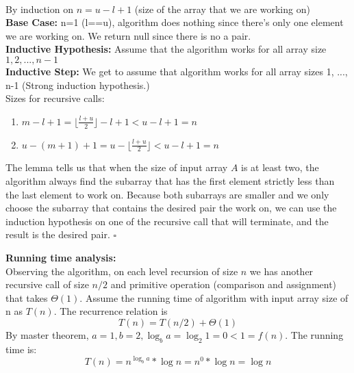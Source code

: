 \documentclass{article}
\begin{document}
\\By induction on $n = u-l+1$ (size of the array that we are working on)
\\\textbf{Base Case:} n=1 (l==u), algorithm does nothing since there's only one element we are working on. We return null since there is no a pair.
\\\textbf{Inductive Hypothesis:} Assume that the algorithm works for all array size $1, 2, ..., n-1$
\\\textbf{Inductive Step:} We get to assume that algorithm works
for all array sizes 1, ..., n-1 (Strong induction hypothesis.) 
\\Sizes for recursive calls:
\begin{enumerate}
    \item $m-l+1 = \lfloor \frac{l+u}{2}\rfloor - l + 1 < u-l+1=n$
    \item $u-(m+1)+1 = u-\lfloor \frac{l+u}{2}\rfloor < u-l+1=n$
\end{enumerate}

The lemma tells us that when the size of input array $A$ is at least two, the algorithm always find the subarray that has the first element strictly less than the last element to work on. Because both subarrays are smaller and we only choose the subarray that contains the desired pair the work on, we can use the induction hypothesis on one of the recursive call that will terminate, and the result is the desired pair. $\square$

\textbf{Running time analysis:}\\
Observing the algorithm, on each level recursion of size $n$ we has another recursive call of size $n/2$ and primitive operation (comparison and assignment) that takes $\Theta(1)$. Assume the running time of algorithm with input array size of n as $T(n)$. The recurrence relation is \[T(n)=T(n/2)+\Theta(1)\]
By master theorem, $a = 1, b = 2, \log_b{a} = \log_2{1} = 0 < 1 = f(n)$. The running time is: \[T(n) = n^{\log_b{a}}*\log{n} = n^0*\log{n} = \log{n}\]
\end{document}
